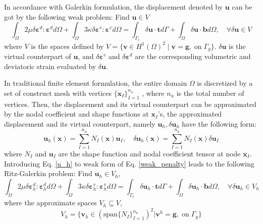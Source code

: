 In accordance with Galerkin formulation, the displacement denoted by $\boldsymbol u$ can be got by the following weak problem: 
Find $\boldsymbol u \in V$
\begin{equation}\label{weak_penalty}
\int_\Omega 2\mu \delta \boldsymbol \varepsilon^d : \boldsymbol \varepsilon^d d\Omega +
\int_\Omega 3\kappa \delta \boldsymbol \varepsilon^v : \boldsymbol \varepsilon^v d\Omega =
\int_{\Gamma_t} \delta \boldsymbol u \cdot \boldsymbol t d\Gamma + \int_\Omega \delta \boldsymbol u \cdot \boldsymbol b d\Omega,  \quad
\forall \delta \boldsymbol u \in V
\end{equation}
where $V$ is the spaces defined by $V=\{\boldsymbol v \in H^1(\Omega)^2\;\vert\;\boldsymbol v = \boldsymbol g, \; \textrm{on} \; \Gamma_g\}$. $\delta \boldsymbol u$ is the virtual counterpart of $\boldsymbol u$, and $\delta \boldsymbol \varepsilon^v$ and $\delta \boldsymbol \varepsilon^d$ are the corresponding volumetric and deviatoric strain evaluated by $\delta \boldsymbol u$.

In traditional finite element formulation, the entire domain $\Omega$ is discretized by a set of construct mesh with vertices $\{\boldsymbol x_I\}_{I=1}^{n_u}$ \cite{hughes2000}, where $n_u$ is the total number of vertices. Then, the displacement and its virtual counterpart can be approximated by the nodal coefficient and shape functions at $\boldsymbol x_I$'s, the approximated displacement and its virtual counterpart, namely $\boldsymbol u_h, \delta \boldsymbol u_h$ have the following form: 
\begin{equation}\label{u_h}
\boldsymbol u_h(\boldsymbol x) = \sum_{I=1}^{n_u} N_I(\boldsymbol x) \boldsymbol u_I, \quad
\delta \boldsymbol u_h(\boldsymbol x) = \sum_{I=1}^{n_u} N_I(\boldsymbol x) \delta \boldsymbol u_I
\end{equation}
where $N_I$ and $\boldsymbol u_I$ are the shape function and nodal coefficient tensor at node $\boldsymbol x_I$.
Introducing Eq. \eqref{u_h} to weak form of Eq. \eqref{weak_penalty} leads to the following Ritz-Galerkin problem:
Find $\boldsymbol u_h \in V_h$,
\begin{equation}\label{ritz_penalty}
\int_\Omega 2\mu \delta \boldsymbol \varepsilon^d_h : \boldsymbol \varepsilon^d_h d\Omega +
\int_\Omega 3\kappa \delta \boldsymbol \varepsilon^v_h : \boldsymbol \varepsilon^v_h d\Omega =
\int_{\Gamma_t} \delta \boldsymbol u_h \cdot \boldsymbol t d\Gamma + \int_\Omega \delta \boldsymbol u_h \cdot \boldsymbol b d\Omega,  \quad
\forall \delta \boldsymbol u_h \in V_h
\end{equation}
where the approximate spaces $V_h \subseteq V$,
\begin{equation}
V_h = \{\boldsymbol v_h \in (\mathrm{span}\{N_I\}_{I=1}^{n_u})^2 \vert \boldsymbol v^h = \boldsymbol g,\; \mathrm{on} \; \Gamma_g\}
\end{equation}

